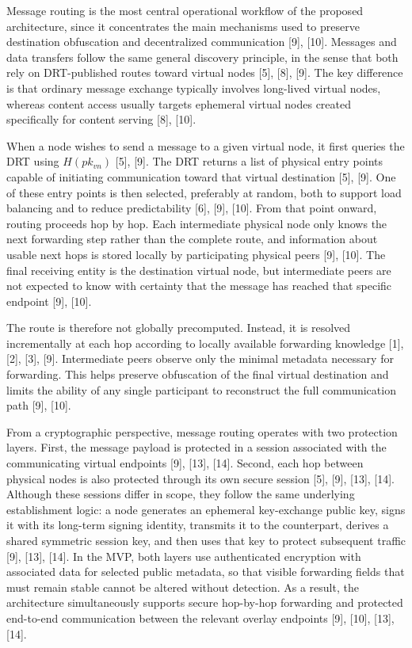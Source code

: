 \documentclass[12pt,a4paper]{article}
\begin{document}
\thesisdeliverytikz

Message routing is the most central operational workflow of the proposed architecture, since it concentrates the main mechanisms used to preserve destination obfuscation and decentralized communication [9], [10]. Messages and data transfers follow the same general discovery principle, in the sense that both rely on DRT-published routes toward virtual nodes [5], [8], [9]. The key difference is that ordinary message exchange typically involves long-lived virtual nodes, whereas content access usually targets ephemeral virtual nodes created specifically for content serving [8], [10].

When a node wishes to send a message to a given virtual node, it first queries the DRT using \(H(pk_{vn})\) [5], [9]. The DRT returns a list of physical entry points capable of initiating communication toward that virtual destination [5], [9]. One of these entry points is then selected, preferably at random, both to support load balancing and to reduce predictability [6], [9], [10]. From that point onward, routing proceeds hop by hop. Each intermediate physical node only knows the next forwarding step rather than the complete route, and information about usable next hops is stored locally by participating physical peers [9], [10]. The final receiving entity is the destination virtual node, but intermediate peers are not expected to know with certainty that the message has reached that specific endpoint [9], [10].

The route is therefore not globally precomputed. Instead, it is resolved incrementally at each hop according to locally available forwarding knowledge [1], [2], [3], [9]. Intermediate peers observe only the minimal metadata necessary for forwarding. This helps preserve obfuscation of the final virtual destination and limits the ability of any single participant to reconstruct the full communication path [9], [10].

From a cryptographic perspective, message routing operates with two protection layers. First, the message payload is protected in a session associated with the communicating virtual endpoints [9], [13], [14]. Second, each hop between physical nodes is also protected through its own secure session [5], [9], [13], [14]. Although these sessions differ in scope, they follow the same underlying establishment logic: a node generates an ephemeral key-exchange public key, signs it with its long-term signing identity, transmits it to the counterpart, derives a shared symmetric session key, and then uses that key to protect subsequent traffic [9], [13], [14]. In the MVP, both layers use authenticated encryption with associated data for selected public metadata, so that visible forwarding fields that must remain stable cannot be altered without detection. As a result, the architecture simultaneously supports secure hop-by-hop forwarding and protected end-to-end communication between the relevant overlay endpoints [9], [10], [13], [14].
\end{document}
